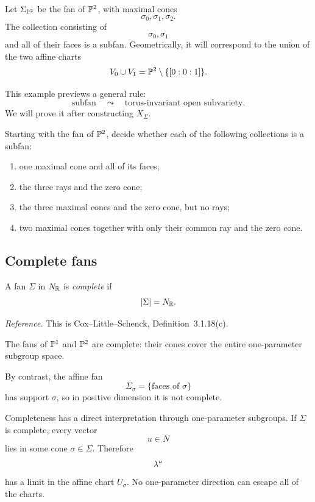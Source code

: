 \begin{example}
Let \(\Sigma_{\mathbb{P}^2}\) be the fan of \(\mathbb{P}^2\), with maximal cones
\[
\sigma_0,\sigma_1,\sigma_2.
\]
The collection consisting of
\[
\sigma_0,\sigma_1
\]
and all of their faces is a subfan. Geometrically, it will correspond
to the union of the two affine charts
\[
V_0\cup V_1
=
\mathbb{P}^2\setminus\{[0:0:1]\}.
\]
\end{example}

This example previews a general rule:
\[
\text{subfan}
\quad\leadsto\quad
\text{torus-invariant open subvariety}.
\]
We will prove it after constructing \(X_\Sigma\).

\begin{pauseandthink}
Starting with the fan of \(\mathbb{P}^2\), decide whether each of the
following collections is a subfan:
\begin{enumerate}[label=(\alph*),wide=0pt]
\item one maximal cone and all of its faces;
\item the three rays and the zero cone;
\item the three maximal cones and the zero cone, but no rays;
\item two maximal cones together with only their common ray and the
zero cone.
\end{enumerate}
\end{pauseandthink}

\subsection{Complete fans}

\begin{definition}
A fan \(\Sigma\) in \(N_{\mathbb{R}}\) is \emph{complete} if
\[
|\Sigma|=N_{\mathbb{R}}.
\]
\end{definition}

\noindent
\textit{Reference.}
This is Cox--Little--Schenck, Definition~3.1.18(c).

The fans of \(\mathbb{P}^1\) and \(\mathbb{P}^2\) are complete: their cones cover
the entire one-parameter subgroup space.

By contrast, the affine fan
\[
\Sigma_\sigma
=
\{\text{faces of }\sigma\}
\]
has support \(\sigma\), so in positive dimension it is not complete.

Completeness has a direct interpretation through one-parameter
subgroups. If \(\Sigma\) is complete, every vector
\[
u\in N
\]
lies in some cone \(\sigma\in\Sigma\). Therefore
\[
\lambda^{u}
\]
has a limit in the affine chart \(U_\sigma\). No one-parameter
direction can escape all of the charts.

